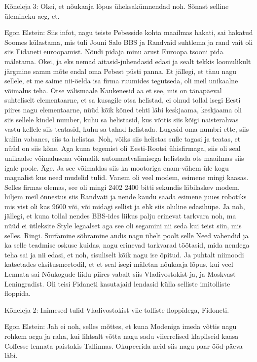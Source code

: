 Kõneleja 3:
Okei, et nõukaaja lõpus üheksakümnendad noh.
Sõnast selline ülemineku aeg, et.
                 
Egon Elstein:
Siis infot, nagu teiste Pebesside kohta maailmas hakati, sai hakatud Soomes külastama, mis tuli Jouni Salo BBS ja Randvaid suhtlema ja rand vait oli siis Fidaneti euroopamist.
Nõudi pidaja minu arust Euroopa tsooni pida mäletama. Okei, ja eks nemad aitasid-juhendasid edasi ja sealt tekkis loomulikult järgmine samm mõte endal oma Pebest püsti panna. Et jällegi, et tänu nagu sellele, et me saime nii-öelda isa firma ruumides tegutseda, oli meil unikaalne võimalus teha.
Otse välismaale Kaukenesid aa et see, mis on tänapäeval suhteliselt elementaarne, et sa kusagile otsa helistad, ei olnud tollal isegi Eesti piires nagu elementaarne, nüüd kõik kõned tehti läbi keskjaama, keskjaama oli siis sellele kindel number, kuhu sa helistasid, kus võttis siis kõigi naisterahvas vastu kellele siis teatasid, kuhu sa tahad helistada. Lugesid oma numbri ette, siis kuliin vabanes, siis ta helistas. Noh, võiks siis helistas sulle tagasi ja teatas, et nüüd on siis kõne. Aga kuna tegemist oli Eesti-Rootsi ühisfirmaga, siis oli seal unikaalse võimalusena võimalik automaatvalimisega helistada ots maailmas siis igale poole. Äge. Ja see võimaldas siis ka mootoriga enam-vähem üle kogu magnalist kus need mudelid tulid. Vanem oli veel modem, esimene mingi kaasas.
Selles firmas olemas, see oli mingi 2402 2400 bitti sekundis läbilaskev modem, hiljem meil õnnestus siis Randvati ja nende kaudu saada esimene juues robotiks mis vist oli kas 9600 või, või midagi sellist ja ehk siis oluline edasihüpe. Ja noh, jällegi, et kuna tollal nendes BBS-ides liikus palju erinevat tarkvara noh, ma nüüd ei ütleksite Style legaalset aga see oli segamini nii seda kui teist siin, mis selles.
Ringi.
Surfamine sõbramine andis nagu ühelt poolt selle
Need vahendid ja ka selle teadmise oskuse kuidas, nagu erinevad tarkvarad töötasid, mida nendega teha sai ja nii edasi, et noh, sisuliselt kõik nagu ise õpitud. Ja puhtalt niimoodi katsetades eksitusmeetodil, et et seal isegi mäletan nõukaaja lõpus, kui veel
Lennata sai Nõukogude liidu piires vabalt siis Vladivostokist ja, ja Moskvast Leningradist.
Oli teisi Fidaneti kasutajaid lendasid külla selliste imitolliste floppida.
                 
Kõneleja 2:
Inimesed tulid Vladivostokist viie tolliste floppidega, Fidoneti.
                 
Egon Elstein:
Jah ei noh, selles mõttes, et kuna Modeniga imeda võttis nagu rohkem aega ja raha, kui lihtsalt võtta nagu sadu viierrelised klapilseid kaasa Coffesse lennata paistakis Tallinnas.
Okupeerida neid siis nagu paar ööd-päeva läbi.
                 

